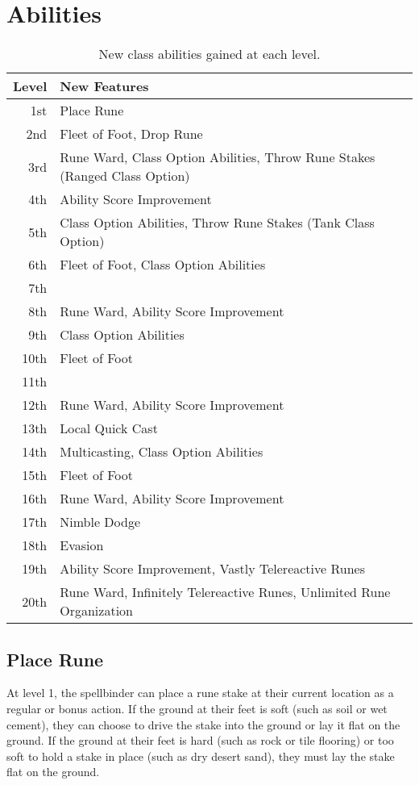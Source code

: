 \section{Abilities}
\begin{table}
\center
\begin{tabular}{r | l }
\toprule
Level & New Features \\
\midrule
1st  & Place Rune \\
2nd  & Fleet of Foot, Drop Rune \\
3rd  & Rune Ward, Class Option Abilities, Throw Rune Stakes (Ranged Class Option) \\
4th  & Ability Score Improvement \\
5th  & Class Option Abilities, Throw Rune Stakes (Tank Class Option) \\
6th  & Fleet of Foot, Class Option Abilities \\
7th  & \\
8th  & Rune Ward, Ability Score Improvement \\
9th  & Class Option Abilities \\
10th & Fleet of Foot \\
11th & \\
12th & Rune Ward, Ability Score Improvement \\
13th & Local Quick Cast \\
14th & Multicasting, Class Option Abilities \\
15th & Fleet of Foot \\
16th & Rune Ward, Ability Score Improvement \\
17th & Nimble Dodge \\
18th & Evasion \\
19th & Ability Score Improvement, Vastly Telereactive Runes \\
20th & Rune Ward, Infinitely Telereactive Runes, Unlimited Rune Organization \\
\bottomrule
\end{tabular}
\label{table:class-ability-schedule}
\caption{New class abilities gained at each level.}
\end{table}

\subsection{Place Rune}
At level 1, the spellbinder can place a rune stake at their current location as a regular or bonus action. If the ground at their feet is soft (such as soil or wet cement), they can choose to drive the stake into the ground or lay it flat on the ground. If the ground at their feet is hard (such as rock or tile flooring) or too soft to hold a stake in place (such as dry desert sand), they must lay the stake flat on the ground.

